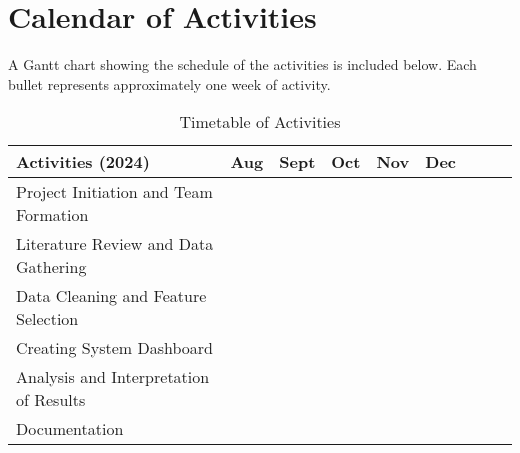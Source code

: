 \section{Calendar of Activities}

A Gantt chart showing the schedule of the activities is included below. Each bullet represents approximately one week of activity.

\newcommand{\weekone}{\textbullet}
\newcommand{\weektwo}{\textbullet \textbullet}
\newcommand{\weekthree}{\textbullet \textbullet \textbullet}
\newcommand{\weekfour}{\textbullet \textbullet \textbullet \textbullet}

\begin{table}[ht]
	\centering
	\caption{Timetable of Activities} \vspace{0.25em}
	\begin{tabular}{|p{2in}|c|c|c|c|c|c|c|c|} \hline
		Activities (2024) & Aug & Sept & Oct & Nov & Dec \\ \hline
		Project Initiation and Team Formation & \weektwo & & & & \\ \hline
		Literature Review and Data Gathering & \weektwo & \weekfour & & & \\ \hline
		Data Cleaning and Feature Selection & & \weektwo & & \weekone & \\ \hline
		
		
		Creating System Dashboard & & \weekone & \weektwo & \weekone & \\ \hline
		Analysis and Interpretation of Results & & & \weekone & & \\ \hline
		Documentation & & \weekone & \weekfour & \weekone & \\ \hline
	\end{tabular}
	\label{tab:timetableactivities}
\end{table}



